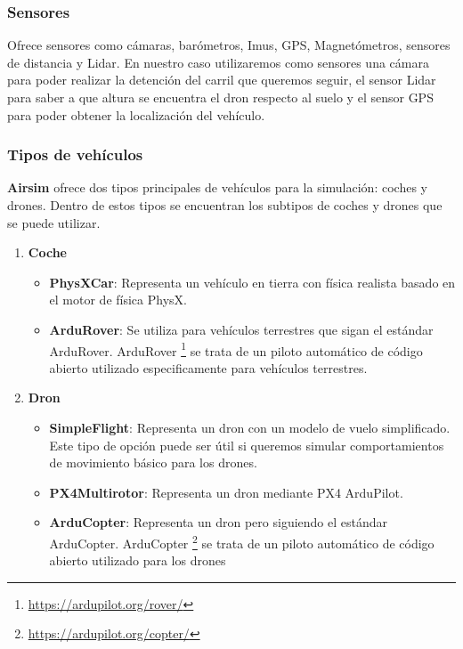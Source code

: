 \subsubsection{Sensores}
\label{sec:airsim}
Ofrece sensores como cámaras, barómetros, Imus, GPS, Magnetómetros, sensores de distancia y Lidar.
En nuestro caso utilizaremos como sensores una cámara para poder realizar la detención del carril 
que queremos seguir, el sensor Lidar para saber a que altura se encuentra el dron respecto al suelo y el sensor
GPS para poder obtener la localización del vehículo. 

\subsubsection{Tipos de vehículos}
\label{sec:airsim}
\textbf{Airsim} ofrece dos tipos principales de vehículos para la simulación: coches y drones. Dentro de estos tipos se encuentran los subtipos de coches y drones que se puede utilizar.

\begin{enumerate}
  \item \textbf{Coche}
    \begin{itemize}
      \item \textbf{PhysXCar}: Representa un vehículo en tierra con física realista basado en el motor de física PhysX.
      \item \textbf{ArduRover}: Se utiliza para vehículos terrestres que sigan el estándar ArduRover. ArduRover \footnote{\url{https://ardupilot.org/rover/}} 
      se trata de un piloto automático de código abierto utilizado especificamente para vehículos terrestres.
    \end{itemize}
    \newpage
  \item \textbf{Dron}
    \begin{itemize}
      \item \textbf{SimpleFlight}: Representa un dron con un modelo de vuelo simplificado. Este tipo de opción puede ser útil si queremos simular comportamientos 
      de movimiento básico para los drones.
      \item \textbf{PX4Multirotor}: Representa un dron mediante PX4 ArduPilot. 
      \item \textbf{ArduCopter}: Representa un dron pero siguiendo el estándar ArduCopter. ArduCopter \footnote{\url{https://ardupilot.org/copter/}} 
      se trata de un piloto automático de código abierto utilizado para los drones 
    \end{itemize}
  
\end{enumerate}

